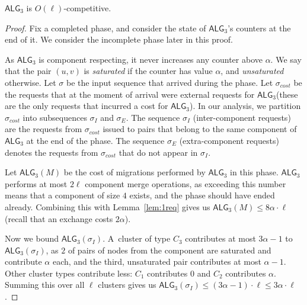 \documentclass[manuscript,screen=true, review, anonymous]{acmart}
\newcommand{\TAlg}{{\ensuremath{\textsf{ALG}_{3}}}\xspace}
\begin{document}
\begin{theorem}
  \TAlg is $O(\ell)$-competitive.
\end{theorem}
\begin{proof}
  Fix a completed phase, and consider the state of \TAlg's counters at the end of it.
  We consider the incomplete phase later in this proof.

  As \TAlg is component respecting, it never increases any counter above $\alpha$.
  We say that the pair $(u, v)$ is \emph{saturated} if the counter has value $\alpha$, and \emph{unsaturated} otherwise.
  Let $\sigma$ be the input sequence that arrived during the phase.
  Let $\sigma_{cost}$ be the requests that at the moment of arrival were external requests for \TAlg (these are the only requests that incurred a cost for \TAlg).
  In our analysis, we partition $\sigma_{cost}$ into subsequences $\sigma_I$ and $\sigma_E$.
  The sequence $\sigma_I$ (inter-component requests) are the requests from $\sigma_{cost}$ issued to pairs that belong to the same component of \TAlg at the end of the phase.
  The sequence $\sigma_E$ (extra-component requests) denotes the requests from $\sigma_{cost}$ that do not appear in $\sigma_I$.


  Let $\TAlg(M)$ be the cost of migrations performed by \TAlg in this phase.
  \TAlg performs at most $2 \ell$ component merge operations, as
  exceeding this number means that a component of size $4$ exists, and the phase should have ended already.
  Combining this with Lemma~\ref{lem:1req} gives us $\TAlg(M) \leq 8\alpha\cdot\ell$ (recall that an exchange costs $2\alpha$).
  
  Now we bound $\TAlg(\sigma_I)$.
  A~cluster of type $C_3$ contributes at most $3 \alpha - 1$ to $\TAlg(\sigma_I)$, as $2$ of pairs of nodes from the component are saturated and contribute $\alpha$ each, and the third, unsaturated pair contributes at most $\alpha-1$.
  Other cluster types contribute less: $C_1$ contributes $0$ and $C_2$ contributes $\alpha$.
  Summing this over all $\ell$ clusters gives us $\TAlg(\sigma_I) \leq (3 \alpha-1)\cdot \ell \leq 3\alpha\cdot\ell$.


\end{proof}
\end{document}
